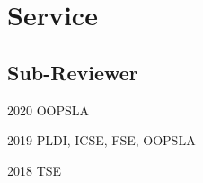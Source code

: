 \documentclass[12pt,letterpaper]{report}
\newcommand{\listitemspace}{0.15em}
\renewenvironment{itemize}
{\begin{list}{}{\setlength{\leftmargin}{0em}
			\setlength{\parskip}{0em}
			\setlength{\itemsep}{\listitemspace}
			\setlength{\parsep}{\listitemspace}}}
	{\end{list}}
\begin{document}
	
	\section*{Service}
	
	\subsection*{Sub-Reviewer}
	\begin{tablist}
		\item[2020] \tab OOPSLA
		\item[2019] \tab PLDI, ICSE, FSE, OOPSLA
		\item[2018] \tab TSE
	\end{tablist}
	
	
%	
%		
%		
%		
%		
%	
%	
%		
%		
%		
%		
	
	
	
\end{document}

